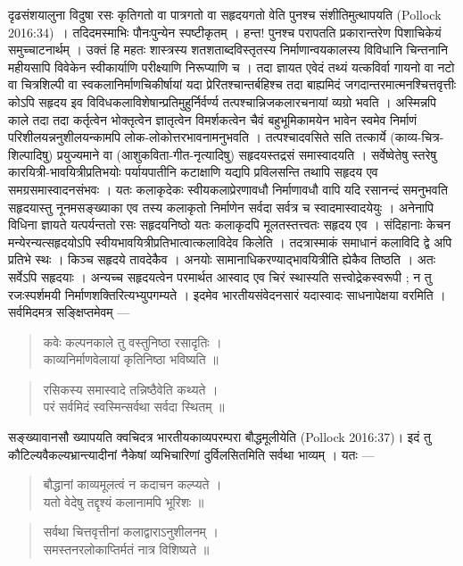 {\dev दृढसंशयालुना विदुषा रसः कृतिगतो वा पात्रगतो वा सहृदयगतो वेति पुनश्च संशीतिमुत्थाप\-यति} (Pollock 2016:34)~{\dev । तदिदमस्माभिः पौनःपुन्येन स्पष्टीकृतम् । हन्त! पुनश्च परापतति प्रकारान्तरेण पिशाचिकेयं समुच्चाटनार्थम् । उक्तं हि महतः शास्त्रस्य शतशताब्दविस्तृतस्य निर्माणान्वयकालस्य विविधानि चिन्तनानि महीयसापि विवेकेन स्वीकार्याणि परीक्ष्याणि निरू\-प्याणि च । तदा ज्ञायत एवेदं तथ्यं यत्कविर्वा गायनो वा नटो वा चित्रशिल्पी वा स्वकलानिर्माण\-चिकीर्षायां यदा प्रेरितश्चान्तर्बहिश्च तदा बाह्यमिदं जगदान्तरमात्मनश्चित्तवृत्तीः कोऽपि सहृदय इव विविधकलाविशेषान्प्रतिमुहुर्निर्वर्ण्य तत्पश्चान्निजकलारचनायां व्यग्रो भवति । अस्मिन्नपि काले तदा तदा कर्तृत्वेन भोक्तृत्वेन ज्ञातृत्वेन विमर्शकत्वेन चैवं बहुभूमिकामयेन भावेन स्वमेव निर्माणं परिशीलयन्ननुशीलयन्कामपि लोक-लोकोत्तरभावनामनुभवति । तत्पश्चादवसिते सति तत्कार्ये (काव्य-चित्र-शिल्पादिषु) प्रयुज्यमाने वा (आशुकविता-गीत-नृत्यादिषु) सहृदयस्तद्रसं समास्वादयति । सर्वेष्वेतेषु स्तरेषु कारयित्री-भावयित्रीप्रतिभयोः पर्यायपातीनि कटाक्षाणि यद्यपि प्रविलसन्ति तथापि सहृदय एव समग्रसमास्वादनसंभवः । यतः कलाकृदेकः स्वीय\-कलाप्रेरणावधौ निर्माणावधौ वापि यदि रसानन्दं समनुभवति सहृदयास्तु नूनमसङ्ख्याका एव तस्य कलाकृतो निर्माणेन सर्वदा सर्वत्र च स्वादमास्वादयेयुः । अनेनापि विधिना ज्ञायते यत्पर्यन्ततो रसः सहृदयनिष्ठो यतः कलाकृदपि मूलतस्तत्त्वतः सहृदय एव । संदिहानाः केचन मन्येरन्यत्सहृदयोऽपि स्वीयभावयित्रीप्रतिभात्वात्कलाविदेव किलेति । तदत्रास्माकं समाधानं कलाविदि द्वे अपि प्रतिभे स्थः । किञ्च सहृदये तावदेकैव । अनयोः सामानाधिकरण्याद्भावयि\-त्रीति ह्येकैव तिष्ठति । अतः सर्वेऽपि सहृदयाः । अन्यच्च सहृदयत्वेन परमार्थत आस्वाद एव चिरं स्थास्यति सत्त्वोद्रेकस्वरूपी ; न तु रजःस्पर्शमयी निर्माणशक्तिरित्यभ्युपगम्यते । इदमेव भारतीयसंवेदनसारं यदास्वादः साधनापेक्षया वरमिति । सर्वमिदमत्र सङ्क्षिप्तमेवम् --- }   
\begin{quote}
{\dev कवेः कल्पनकाले तु वस्तुनिष्ठा रसादृतिः ।}\\
{\dev काव्यनिर्माणवेलायां कृतिनिष्ठा भविष्यति ॥}
\end{quote}
\begin{quote}
{\dev रसिकस्य समास्वादे तन्निष्ठैवेति कथ्यते ।}\\
{\dev परं सर्वमिदं स्वस्मिन्सर्वथा सर्वदा स्थितम् ॥}
\end{quote}

{\dev सङ्ख्यावानसौ ख्यापयति क्वचिदत्र भारतीयकाव्यपरम्परा बौद्धमूलीयेति} (Pollock 2016:37){\dev । इदं तु कौटिल्यवैकल्यभ्रान्त्यादीनां नैकेषां व्यभिचारिणां दुर्विलसितमिति सर्वथा भाव्यम् । यतः ---}
\begin{quote}
{\dev बौद्धानां काव्यमूलत्वं न कदाचन कल्प्यते ।}\\
{\dev यतो वेदेषु तद्दृश्यं कलानामपि भूरिशः ॥}
\end{quote}
\begin{quote}
{\dev सर्वथा चित्तवृत्तीनां कलाद्वाराऽनुशीलनम् ।}\\
{\dev समस्तनरलोकाप्तिर्मतं नात्र विशिष्यते ॥}
\end{quote}

